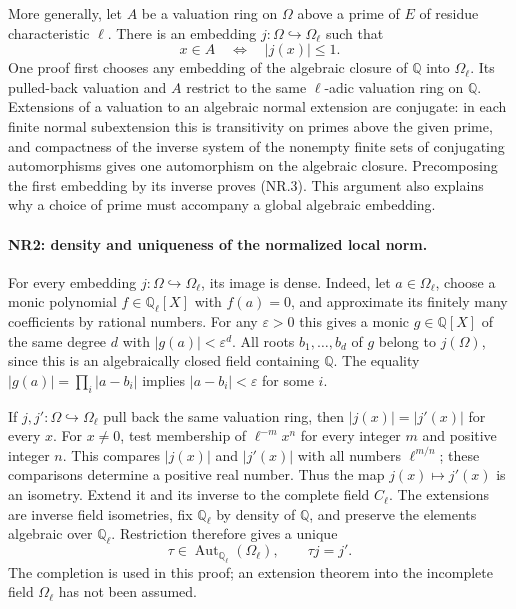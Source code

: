 More generally, let $A$ be a valuation ring on $\Omega$ above a prime
of $E$ of residue characteristic $\ell$. There is an embedding
$j:\Omega\hookrightarrow\Omega_\ell$ such that
\[
                    x\in A\quad\Longleftrightarrow\quad |j(x)|\le1.
                                                               \tag{NR.3}
\]
One proof first chooses any embedding of the algebraic closure of
$\mathbb Q$ into $\Omega_\ell$. Its pulled-back valuation and $A$
restrict to the same $\ell$-adic valuation ring on $\mathbb Q$.
Extensions of a valuation to an algebraic normal extension are
conjugate: in each finite normal subextension this is transitivity on
primes above the given prime, and compactness of the inverse system
of the nonempty finite sets of conjugating automorphisms gives one
automorphism on the algebraic closure. Precomposing the first
embedding by its inverse proves (NR.3). This argument also explains
why a choice of prime must accompany a global algebraic embedding.

\paragraph{NR2: density and uniqueness of the normalized local norm.}
For every embedding $j:\Omega\hookrightarrow\Omega_\ell$, its image
is dense. Indeed, let $a\in\Omega_\ell$, choose a monic polynomial
$f\in\mathbb Q_\ell[X]$ with $f(a)=0$, and approximate its finitely
many coefficients by rational numbers. For any $\varepsilon>0$ this
gives a monic $g\in\mathbb Q[X]$ of the same degree $d$ with
$|g(a)|<\varepsilon^d$. All roots $b_1,\ldots,b_d$ of $g$ belong to
$j(\Omega)$, since this is an algebraically closed field containing
$\mathbb Q$. The equality
$|g(a)|=\prod_i|a-b_i|$ implies $|a-b_i|<\varepsilon$ for some $i$.

If $j,j':\Omega\hookrightarrow\Omega_\ell$ pull back the same
valuation ring, then $|j(x)|=|j'(x)|$ for every $x$. For $x\ne0$, test
membership of $\ell^{-m}x^n$ for every integer $m$ and positive integer
$n$. This compares $|j(x)|$ and $|j'(x)|$ with all numbers
$\ell^{m/n}$; these comparisons determine a positive real number.
Thus the map $j(x)\mapsto j'(x)$ is an isometry. Extend it and its
inverse to the complete field $C_\ell$. The extensions are inverse
field isometries, fix $\mathbb Q_\ell$ by density of $\mathbb Q$, and
preserve the elements algebraic over $\mathbb Q_\ell$. Restriction
therefore gives a unique
\[
             \tau\in\operatorname{Aut}_{\mathbb Q_\ell}(\Omega_\ell),
             \qquad \tau j=j'.                         \tag{NR.4}
\]
The completion is used in this proof; an extension theorem into the
incomplete field $\Omega_\ell$ has not been assumed.


